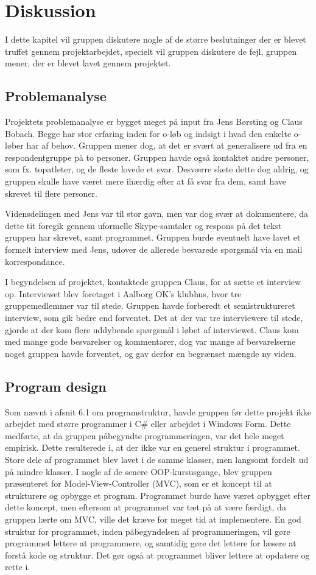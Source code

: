 \chapter{Diskussion}
I dette kapitel vil gruppen diskutere nogle af de større beslutninger der er blevet truffet gennem projektarbejdet, specielt vil gruppen diskutere de fejl, gruppen mener, der er blevet lavet gennem projektet. 
\section{Problemanalyse}
Projektets problemanalyse er bygget meget på input fra Jens Børsting og Claus Bobach. Begge har stor erfaring inden for o-løb og indsigt i hvad den enkelte o-løber har af behov. Gruppen mener dog, at det er svært at generalisere ud fra en respondentgruppe på to personer. Gruppen havde også kontaktet andre personer, som fx. topatleter, og de fleste lovede et svar. Desværre skete dette dog aldrig, og gruppen skulle have været mere ihærdig efter at få svar fra dem, samt have skrevet til flere personer. 

Vidensdelingen med Jens var til stor gavn, men var dog svær at dokumentere, da dette tit foregik gennem uformelle Skype-samtaler og respons på det tekst gruppen har skrevet, samt programmet. Gruppen burde eventuelt have lavet et formelt interview med Jens, udover de allerede besvarede spørgsmål via en mail korrespondance. 

I begyndelsen af projektet, kontaktede gruppen Claus, for at sætte et interview op. Interviewet blev foretaget i Aalborg OK’s klubhus, hvor tre gruppemedlemmer var til stede. Gruppen havde forberedt et semistruktureret interview, som gik bedre end forventet. Det at der var tre interviewere til stede, gjorde at der kom flere uddybende spørgsmål i løbet af interviewet. Claus kom med mange gode besvarelser og kommentarer, dog var mange af besvarelserne noget gruppen havde forventet, og gav derfor en begrænset mængde ny viden. 
\section{Program design}
Som nævnt i afsnit 6.1 om programstruktur, havde gruppen før dette projekt ikke arbejdet med større programmer i C\# eller arbejdet i Windows Form. Dette medførte, at da gruppen påbegyndte programmeringen, var det hele meget empirisk. Dette resulterede i, at der ikke var en generel struktur i programmet. Store dele af programmet blev lavet i de samme klasser, men langsomt fordelt ud på mindre klasser. I nogle af de senere OOP-kursusgange, blev gruppen præsenteret for Model-View-Controller (MVC), som er et koncept til at strukturere og opbygge et program. Programmet burde have været opbygget efter dette koncept, men eftersom at programmet var tæt på at være færdigt, da gruppen lærte om MVC, ville det kræve for meget tid at implementere.\newline
En god struktur for programmet, inden påbegyndelsen af programmeringen, vil gøre programmet lettere at programmere, og samtidig gøre det lettere for læsere at forstå kode og struktur. Det gør også at programmet bliver lettere at opdatere og rette i. 

